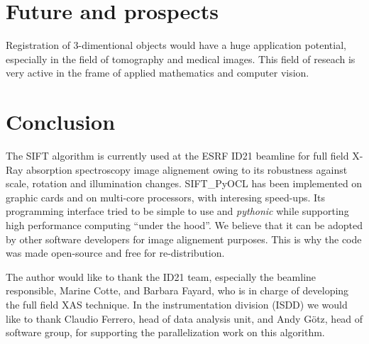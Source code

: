 \documentclass[preprint]{iucr}
\begin{document}
\section{Future and prospects}

Registration of 3-dimentional objects would have a huge application potential,
especially in the field of tomography and medical images.
This field of reseach
is very active in the frame of applied mathematics and computer vision.


\section{Conclusion}

The SIFT algorithm is currently used at the ESRF ID21 beamline for full field
X-Ray absorption spectroscopy image alignement owing to its robustness against
scale, rotation and illumination changes. 
SIFT\_PyOCL has been implemented on
graphic cards and on multi-core processors, with interesing
speed-ups.
Its programming interface tried to be simple to use and \emph{pythonic} while
supporting high performance computing ``under the hood''. 
We believe that it can be
adopted by other software developers for image alignement purposes.
This is why the code was made open-source and free for re-distribution.



The author would like to thank the ID21 team, especially the beamline
responsible, Marine Cotte, and Barbara Fayard, who is in charge of developing
the full field XAS technique.
In the instrumentation division (ISDD) we would like to thank Claudio Ferrero,
head of data analysis unit, and Andy G\"otz, head of software group, for
supporting the parallelization work on this algorithm.



\end{document}
